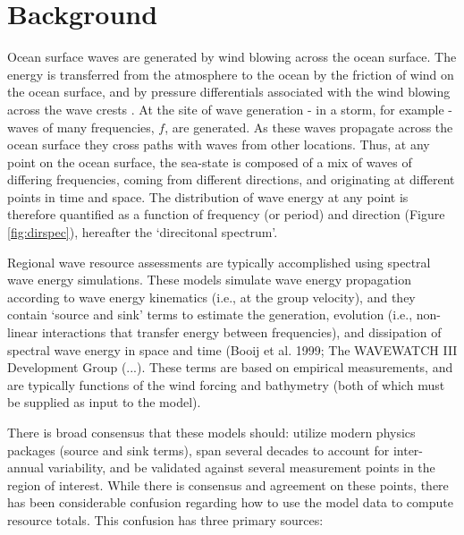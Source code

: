 \section{Background}

Ocean surface waves are generated by wind blowing across the ocean surface. The
energy is transferred from the atmosphere to the ocean by the friction of wind
on the ocean surface, and by pressure differentials associated with the wind
blowing across the wave crests
\citep[]{phillipsDynamicsUpperOcean1980,youngWindGeneratedOcean1999}. At the
site of wave generation - in a storm, for example - waves of many frequencies,
$f$, are generated. As these waves propagate across the ocean surface they cross
paths with waves from other locations. Thus, at any point on the ocean surface,
the sea-state is composed of a mix of waves of differing frequencies, coming
from different directions, and originating at different points in time and
space. The distribution of wave energy at any point is therefore quantified as a function of 
frequency (or period) and direction 
(Figure \ref{fig:dirspec}), hereafter the `direcitonal spectrum'.

Regional wave resource assessments are typically accomplished using spectral
wave energy simulations. These models simulate wave energy propagation according
to wave energy kinematics (i.e., at the group velocity), and they contain
‘source and sink’ terms to estimate the generation, evolution (i.e., non-linear
interactions that transfer energy between frequencies), and dissipation of
spectral wave energy in space and time (Booij et al. 1999; The WAVEWATCH III
Development Group (...). These terms are based on empirical measurements, and
are typically functions of the wind forcing and bathymetry (both of which must
be supplied as input to the model).

There is broad consensus that these models should: utilize modern physics packages (source and sink terms), span several decades to account for inter-annual variability, and be validated against several measurement points in the region of interest. While there is consensus and agreement on these points, there has been considerable confusion regarding how to use the model data to compute resource totals. This confusion has three primary sources:


